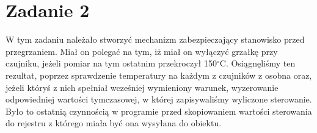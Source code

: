 \chapter{Zadanie 2}
W tym zadaniu należało stworzyć mechanizm zabezpieczający stanowisko przed przegrzaniem.
Miał on polegać na tym, iż miał on wyłączyć grzałkę przy czujniku, jeżeli
pomiar na tym ostatnim przekroczył 150$^\circ$C. Osiągnęliśmy ten rezultat,
poprzez sprawdzenie temperatury na każdym z czujników z osobna oraz,
jeżeli któryś z nich spełniał wcześniej wymieniony warunek, wyzerowanie
odpowiedniej wartości tymczasowej, w której zapisywaliśmy wyliczone sterowanie.
Było to ostatnią czynnością w programie przed skopiowaniem wartości sterowania
do rejestru z którego miała być ona wysyłana do obiektu.

